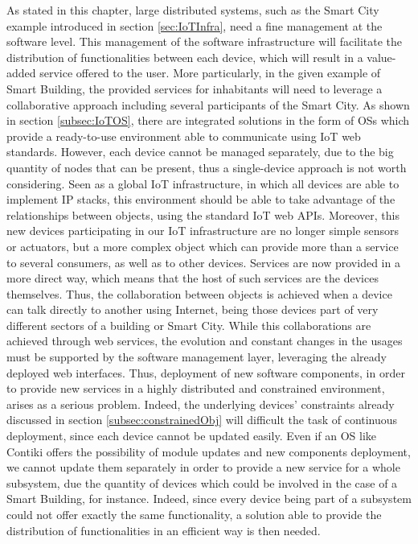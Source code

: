 As stated in this chapter, large distributed systems, such as the Smart City example introduced in section \ref{sec:IoTInfra}, need a fine management at the software level.
This management of the software infrastructure will facilitate the distribution of functionalities between each device, which will result in a value-added service offered to the user.
More particularly, in the given example of Smart Building, the provided services for inhabitants will need to leverage a collaborative approach including several participants of the Smart City.
As shown in section \ref{subsec:IoTOS}, there are integrated solutions in the form of OSs which provide a ready-to-use environment able to communicate using IoT web standards.
However, each device cannot be managed separately, due to the big quantity of nodes that can be present, thus a single-device approach is not worth considering.
Seen as a global IoT infrastructure, in which all devices are able to implement IP stacks, this environment should be able to take advantage of the relationships between objects, using the standard IoT web APIs.
Moreover, this new devices participating in our IoT infrastructure are no longer simple sensors or actuators, but a more complex object which can provide more than a service to several consumers, as well as to other devices.
Services are now provided in a more direct way, which means that the host of such services are the devices themselves.
Thus, the collaboration between objects is achieved when a device can talk directly to another using Internet, being those devices part of very different sectors of a building or Smart City.
While this collaborations are achieved through web services, the evolution and constant changes in the usages must be supported by the software management layer, leveraging the already deployed web interfaces.
Thus, deployment of new software components, in order to provide new services in a highly distributed and constrained environment, arises as a serious problem.
Indeed, the underlying devices' constraints already discussed in section \ref{subsec:constrainedObj} will difficult the task of continuous deployment, since each device cannot be updated easily.
Even if an OS like Contiki offers the possibility of module updates and new components deployment, we cannot update them separately in order to provide a new service for a whole subsystem, due the quantity of devices which could be involved in the case of a Smart Building, for instance.
Indeed, since every device being part of a subsystem could not offer exactly the same functionality, a solution able to provide the distribution of functionalities in an efficient way is then needed.

